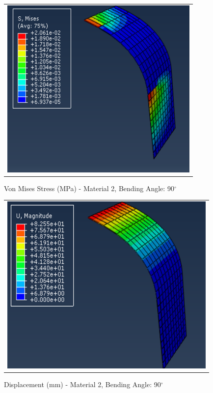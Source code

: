 \documentclass[a4paper,12pt]{article}
\numberwithin{equation}{section}
\numberwithin{figure}{section}
\begin{document}
\begin{figure}[H]
  \centering
  \begin{tabular}{@{}c@{}}
    \includegraphics[width=0.7\linewidth,height=255pt]{Results/Bending/M2_VMS_90.png} \\
  \end{tabular}
  \caption{Von Mises Stress (MPa) - Material 2,  Bending Angle: 90$^{\circ}$ }
\end{figure}

\begin{figure}[H]
  \centering
  \begin{tabular}{@{}c@{}}
    \includegraphics[width=0.7\linewidth,height=255pt]{Results/Bending/M2_DIS_90.png} \\
  \end{tabular}
  \caption{Displacement (mm) - Material 2, Bending Angle: 90$^{\circ}$ }
\end{figure}
\end{document}
